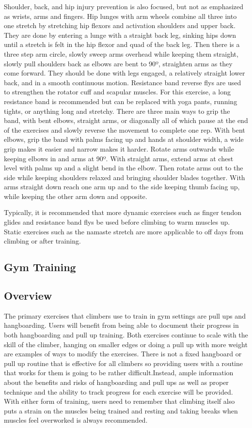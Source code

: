 \documentclass[10pt,twocolumn]{article}
\begin{document}
    Shoulder, back, and hip injury prevention is also focused, but not as emphasized as wrists, arms and fingers. Hip lunges with arm wheels combine all three into one stretch by stretching hip flexors and activation shoulders and upper back. They are done by entering a lunge with a straight back leg, sinking hips down until a stretch is felt in the hip flexor and quad of the back leg. Then there is a three step arm circle, slowly sweep arms overhead while keeping them straight, slowly pull shoulders back as elbows are bent to 90º, straighten arms as they come forward. They should be done with legs engaged, a relatively straight lower back, and in a smooth continuous motion. Resistance band reverse flys are used to strengthen the rotator cuff and scapular muscles. For this exercise, a long resistance band is recommended but can be replaced with yoga pants, running tights, or anything long and stretchy. There are three main ways to grip the band, with bent elbows, straight arms, or diagonally all of which pause at the end of the exercises and slowly reverse the movement to complete one rep. With bent elbows, grip the band with palms facing up and hands at shoulder width, a wide grip makes it easier and narrow makes it harder. Rotate arms outwards while keeping elbows in and arms at 90º. With straight arms, extend arms at chest level with palms up and a slight bend in the elbow. Then rotate arms out to the side while keeping shoulders relaxed and bringing shoulder blades together. With arms straight down reach one arm up and to the side keeping thumb facing up, while keeping the other arm down and opposite. \cite{carpenter_prevent_2020}
    
    Typically, it is recommended that more dynamic exercises such as finger tendon glides and resistance band flys be used before climbing to warm muscles up. Static exercises such as the namaste stretch are more applicable to off days from climbing or after training.
\subsection{Gym Training} 

\subsection{Overview}
    The primary exercises that climbers use to train in gym settings are pull ups and hangboarding. Users will benefit from being able to document their progress in both hangboarding and pull up training. Both exercises continue to scale with the skill of the climber, hanging on smaller edges or doing a pull up with more weight are examples of ways to modify the exercises. There is not a fixed hangboard or pull up routine that is effective for all climbers so providing users with a routine that works for them is going to be rather difficult.Instead, ample information about the benefits and risks of hangboarding and pull ups as well as proper technique and the ability to track progress for each exercise will be provided. With either form of training, users need to remember that climbing itself also puts a strain on the muscles being trained and resting and taking breaks when muscles feel overworked is always recommended.  
\end{document}
